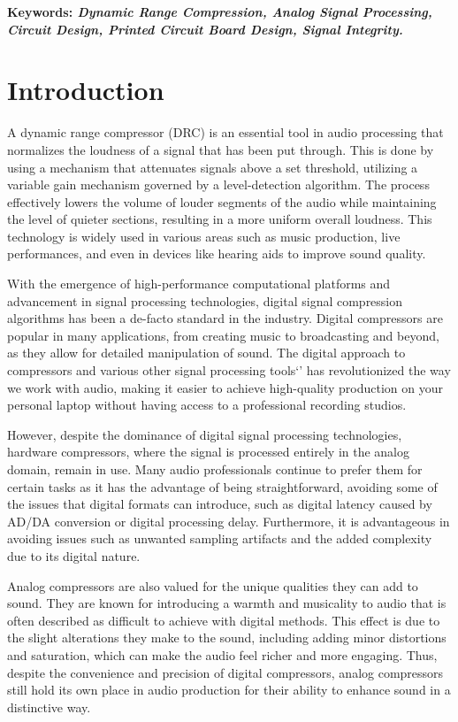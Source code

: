 \documentclass[10pt]{article}
\begin{document}
    \begin{multicols*}{2}

        \textbf{
            Keywords: 
            \textit{Dynamic Range Compression, Analog Signal Processing, Circuit Design, Printed Circuit Board Design, Signal Integrity.}
        }

        \section{Introduction}
            A dynamic range compressor (DRC) is an essential tool in audio processing that normalizes the loudness of a signal that has been put through. This is done by using a mechanism that attenuates signals above a set threshold, utilizing a variable gain mechanism governed by a level-detection algorithm. The process effectively lowers the volume of louder segments of the audio while maintaining the level of quieter sections, resulting in a more uniform overall loudness. This technology is widely used in various areas such as music production, live performances, and even in devices like hearing aids to improve sound quality.\par
            With the emergence of high-performance computational platforms and advancement in signal processing technologies, digital signal compression algorithms has been a de-facto standard in the industry. Digital compressors are popular in many applications, from creating music to broadcasting and beyond, as they allow for detailed manipulation of sound. The digital approach to compressors and various other signal processing tools`' has revolutionized the way we work with audio, making it easier to achieve high-quality production on your personal laptop without having access to a professional recording studios.\par
            However, despite the dominance of digital signal processing technologies, hardware compressors, where the signal is processed entirely in the analog domain, remain in use. Many audio professionals continue to prefer them for certain tasks as it has the advantage of being straightforward, avoiding some of the issues that digital formats can introduce, such as digital latency caused by AD/DA conversion or digital processing delay. Furthermore, it is advantageous in avoiding issues such as unwanted sampling artifacts and the added complexity due to its digital nature.\par
            Analog compressors are also valued for the unique qualities they can add to sound. They are known for introducing a warmth and musicality to audio that is often described as difficult to achieve with digital methods. This effect is due to the slight alterations they make to the sound, including adding minor distortions and saturation, which can make the audio feel richer and more engaging. Thus, despite the convenience and precision of digital compressors, analog compressors still hold its own place in audio production for their ability to enhance sound in a distinctive way.\par

\end{multicols*}
\end{document}
